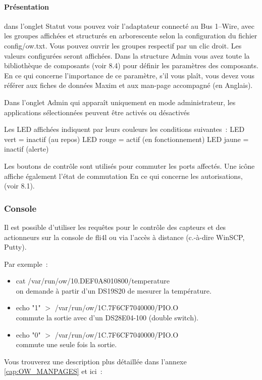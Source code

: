 \paragraph{Présentation}
dans l'onglet \flqq{}Statut\frqq{} vous pouvez voir l'adaptateur connecté au Bus 1--Wire, avec
les groupes affichées et structurés en arborescente selon la configuration du fichier config/ow.txt.
Vous pouvez ouvrir les groupes respectif par un \flqq{}clic\frqq{} droit. Les valeurs configurées
seront affichées. Dans la structure Admin vous avez toute la bibliothèque de composants (voir 8.4)
pour définir les paramètres des composants. En ce qui concerne l'importance de ce paramètre, s'il
vous plaît, vous devez vous référer aux fiches de données Maxim et aux man-page accompagné (en Anglais).

Dans l'onglet \flqq{}Admin\frqq{} qui apparaît uniquement en mode administrateur, les applications
sélectionnées peuvent être activés ou désactivés

Les LED affichées indiquent par leurs couleurs les conditions suivantes~:
LED vert = inactif (au repos)
LED rouge = actif (en fonctionnement)
LED jaune = inactif (alerte)

Les boutons de contrôle sont utilisés pour commuter les ports affectés. Une icône affiche également
l'état de commutation  En ce qui concerne les autorisations, (voir 8.1).

\subsubsection{Console}
Il est possible d'utiliser les requêtes pour le contrôle des capteurs et des actionneurs sur la console
de fli4l ou via l'accès à distance (c.-à-dire WinSCP, Putty).

Par exemple~:
\begin{itemize}
\item cat /var/run/ow/10.DEF0A8010800/temperature \\
      on demande à partir d'un DS19S20 de mesurer la température.
\item echo "1" $>$ /var/run/ow/1C.7F6CF7040000/PIO.O \\
      commute la sortie  avec d'un DS28E04-100 (double switch).
\item echo "0" $>$ /var/run/ow/1C.7F6CF7040000/PIO.O \\
      commute une seule fois la sortie.
\end{itemize}

Vous trouverez une description plus détaillée dans l'annexe \flqq{}\ref{cap:OW_MANPAGES}\frqq{}
et ici~: 

